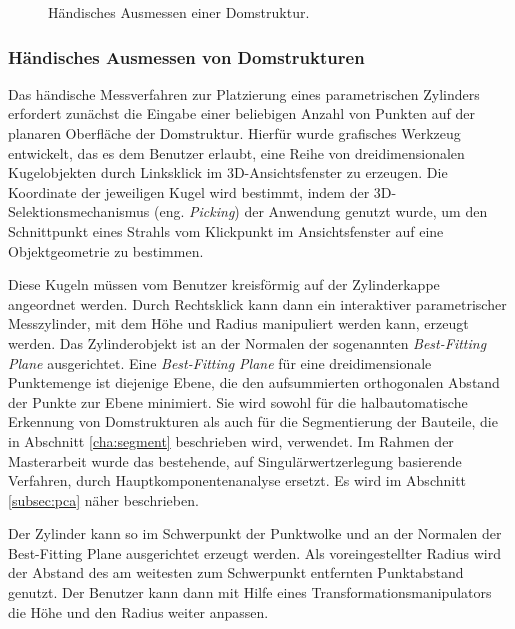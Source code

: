 \begin{figure}[ht]
\caption{H\"andisches Ausmessen einer Domstruktur.} 
\label{im:domes1}
\end{figure} 

\subsubsection{H\"andisches Ausmessen von Domstrukturen}
\label{domeMeasure}

Das h\"andische Messverfahren zur Platzierung eines parametrischen Zylinders erfordert zun\"achst die Eingabe einer beliebigen Anzahl von Punkten auf der planaren Oberfl\"ache der Domstruktur. Hierf\"ur wurde grafisches Werkzeug entwickelt, das es dem Benutzer erlaubt, eine Reihe von dreidimensionalen Kugelobjekten durch Linksklick im 3D-Ansichtsfenster zu erzeugen. Die Koordinate der jeweiligen Kugel wird bestimmt, indem der 3D-Selektionsmechanismus (eng. \textit{Picking}) der Anwendung genutzt wurde, um den Schnittpunkt eines Strahls vom Klickpunkt im Ansichtsfenster auf eine Objektgeometrie zu bestimmen.

Diese Kugeln m\"ussen vom Benutzer kreisf\"ormig auf der Zylinderkappe angeordnet werden. Durch Rechtsklick kann dann ein interaktiver parametrischer Messzylinder, mit dem H\"ohe und Radius manipuliert werden kann, erzeugt werden. Das Zylinderobjekt ist an der Normalen der sogenannten \textit{Best-Fitting Plane} ausgerichtet. Eine \textit{Best-Fitting Plane} f\"ur eine dreidimensionale Punktemenge ist diejenige Ebene, die den aufsummierten orthogonalen Abstand der Punkte zur Ebene minimiert. Sie wird sowohl f\"ur die halbautomatische Erkennung von Domstrukturen als auch f\"ur die Segmentierung der Bauteile, die in Abschnitt \ref{cha:segment} beschrieben wird, verwendet. Im Rahmen der Masterarbeit wurde das bestehende, auf Singulärwertzerlegung basierende Verfahren, durch Hauptkomponentenanalyse ersetzt. Es wird im Abschnitt \ref{subsec:pca} näher beschrieben.

Der Zylinder kann so im Schwerpunkt der Punktwolke und an der Normalen der Best-Fitting Plane ausgerichtet erzeugt werden. Als voreingestellter Radius wird der Abstand des am weitesten zum Schwerpunkt entfernten Punktabstand genutzt.
Der Benutzer kann dann mit Hilfe eines Transformationsmanipulators die Höhe und den Radius weiter anpassen.


